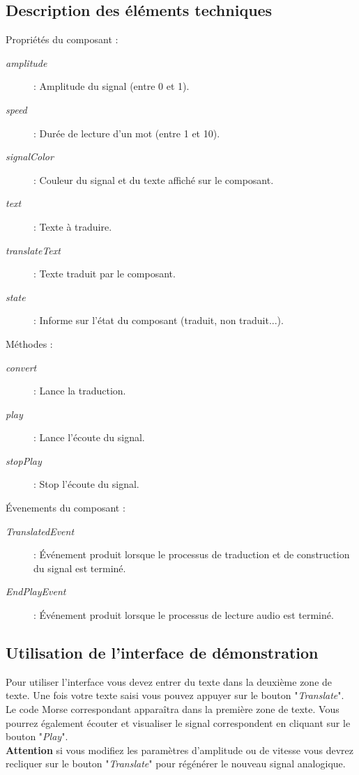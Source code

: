 \documentclass[a4paper,11pt]{article}
\begin{document}
    \subsection{Description des éléments techniques}
    \noindent
    Propriétés du composant :
    \begin{description}
        \item[\textit{amplitude}] : Amplitude du signal (entre 0 et 1).
        \item [\textit{speed}] : Durée de lecture d'un mot (entre 1 et 10).
        \item[\textit{signalColor}] : Couleur du signal et du texte affiché sur le composant.
        \item[\textit{text}] : Texte à traduire.
        \item[\textit{translateText}] : Texte traduit par le composant.
        \item[\textit{state}] : Informe sur l'état du composant (traduit, non traduit...).
    \end{description}
    Méthodes :
    \begin{description}
        \item[\textit{convert}] : Lance la traduction.
        \item[\textit{play}] : Lance l'écoute du signal.
        \item[\textit{stopPlay}] : Stop l'écoute du signal.
    \end{description}
    Évenements du composant :
    \begin{description}
        \item[\textit{TranslatedEvent}] : Événement produit lorsque le processus de traduction et de construction du signal est terminé.
        \item[\textit{EndPlayEvent}] : Événement produit lorsque le processus de lecture audio est terminé.
    \end{description}


    \subsection{Utilisation de l'interface de démonstration}
    Pour utiliser l'interface vous devez entrer du texte dans la deuxième zone de texte. Une fois votre texte saisi vous pouvez appuyer sur le bouton "\textit{Translate}". Le code Morse correspondant apparaîtra dans la première zone de texte. Vous pourrez également écouter et visualiser le signal correspondent en cliquant sur le bouton "\textit{Play}".\\
    \textbf{Attention} si vous modifiez les paramètres d'amplitude ou de vitesse vous devrez recliquer sur le bouton "\textit{Translate}" pour régénérer le nouveau signal analogique.
\end{document}
